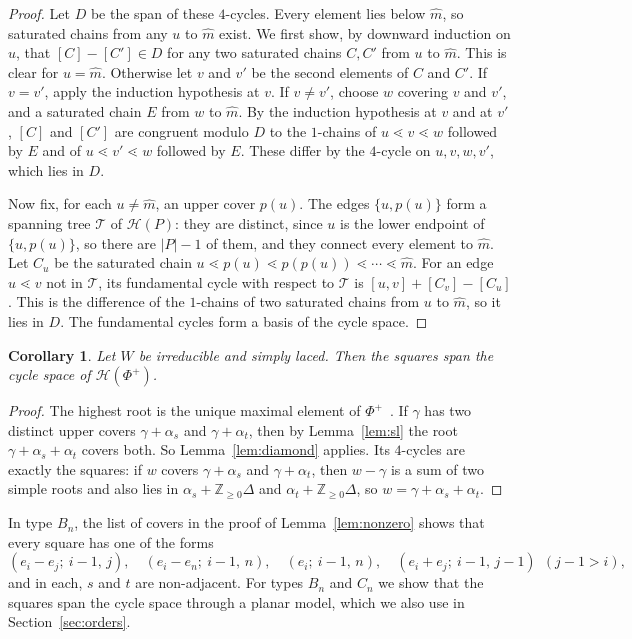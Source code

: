 \documentclass[11pt]{amsart}
\newtheorem{corollary}[theorem]{Corollary}
\theoremstyle{definition}
\newcommand{\Hasse}{\mathcal H}
\begin{document}
\begin{proof}
Let $D$ be the span of these $4$-cycles. Every element lies below $\hat m$, so saturated chains from any $u$ to $\hat m$ exist. We first show, by downward induction on $u$, that $[C]-[C']\in D$ for any two saturated chains $C,C'$ from $u$ to $\hat m$. This is clear for $u=\hat m$. Otherwise let $v$ and $v'$ be the second elements of $C$ and $C'$. If $v=v'$, apply the induction hypothesis at $v$. If $v\neq v'$, choose $w$ covering $v$ and $v'$, and a saturated chain $E$ from $w$ to $\hat m$. By the induction hypothesis at $v$ and at $v'$, $[C]$ and $[C']$ are congruent modulo $D$ to the $1$-chains of $u\lessdot v\lessdot w$ followed by $E$ and of $u\lessdot v'\lessdot w$ followed by $E$. These differ by the $4$-cycle on $u,v,w,v'$, which lies in $D$.

Now fix, for each $u\neq\hat m$, an upper cover $p(u)$. The edges $\{u,p(u)\}$ form a spanning tree $\mathcal T$ of $\Hasse(P)$: they are distinct, since $u$ is the lower endpoint of $\{u,p(u)\}$, so there are $|P|-1$ of them, and they connect every element to $\hat m$. Let $C_u$ be the saturated chain $u\lessdot p(u)\lessdot p(p(u))\lessdot\cdots\lessdot\hat m$. For an edge $u\lessdot v$ not in $\mathcal T$, its fundamental cycle with respect to $\mathcal T$ is $[u,v]+[C_v]-[C_u]$. This is the difference of the $1$-chains of two saturated chains from $u$ to $\hat m$, so it lies in $D$. The fundamental cycles form a basis of the cycle space.
\end{proof}

\begin{corollary}\label{cor:slspan}
Let $W$ be irreducible and simply laced. Then the squares span the cycle space of $\Hasse(\Phi^+)$.
\end{corollary}

\begin{proof}
The highest root is the unique maximal element of $\Phi^+$~\cite[Ch.~VI, \S1, no.~8, Prop.~25]{Bou}. If $\gamma$ has two distinct upper covers $\gamma+\alpha_s$ and $\gamma+\alpha_t$, then by Lemma~\ref{lem:sl} the root $\gamma+\alpha_s+\alpha_t$ covers both. So Lemma~\ref{lem:diamond} applies. Its $4$-cycles are exactly the squares: if $w$ covers $\gamma+\alpha_s$ and $\gamma+\alpha_t$, then $w-\gamma$ is a sum of two simple roots and also lies in $\alpha_s+\mathbb Z_{\ge0}\Delta$ and $\alpha_t+\mathbb Z_{\ge0}\Delta$, so $w=\gamma+\alpha_s+\alpha_t$.
\end{proof}

In type $B_n$, the list of covers in the proof of Lemma~\ref{lem:nonzero} shows that every square has one of the forms
\[(e_i-e_j;\ i-1,\,j),\quad (e_i-e_n;\ i-1,\,n),\quad (e_i;\ i-1,\,n),\quad (e_i+e_j;\ i-1,\,j-1)\ \ (j-1>i),\]
and in each, $s$ and $t$ are non-adjacent. For types $B_n$ and $C_n$ we show that the squares span the cycle space through a planar model, which we also use in Section~\ref{sec:orders}.
\end{document}
